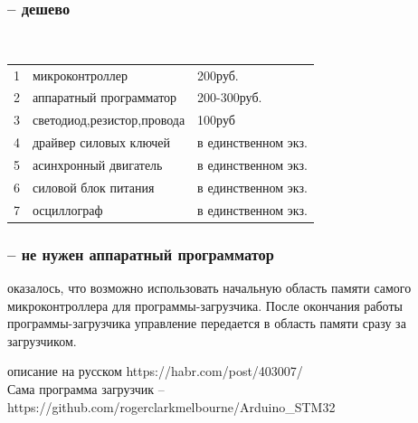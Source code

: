 \documentclass[14pt]{beamer}
\begin{document}
\begin{frame}
\frametitle{ -- дешево} 
\begin{figure}
\begin{center}
\begin{minipage}[h]{0.5\linewidth}
  \\
\end{minipage}
\end{center}
\end{figure} 
\begin{tabular}{lll}
	1&микроконтроллер		&200руб.\\
	2&аппаратный программатор	&200-300руб.\\
	3&светодиод,резистор,провода&100руб\\
	4&драйвер силовых ключей&в единственном экз.\\
	5&асинхронный двигатель&в единственном экз.\\
	6&силовой блок питания&в единственном экз.\\
	7&осциллограф&в единственном экз.
\end{tabular}
\end{frame}


\begin{frame}
\frametitle{ -- не нужен аппаратный программатор}
оказалось, что возможно использовать начальную область памяти самого микроконтроллера для программы-загрузчика. После окончания работы программы-загрузчика управление
передается в область памяти сразу за загрузчиком.
	\vspace{0.5cm}

описание на русском https://habr.com/post/403007/\\

	Сама  программа загрузчик -- \\
{\small https://github.com/rogerclarkmelbourne/Arduino\_STM32} 
\end{frame}
\end{document}
